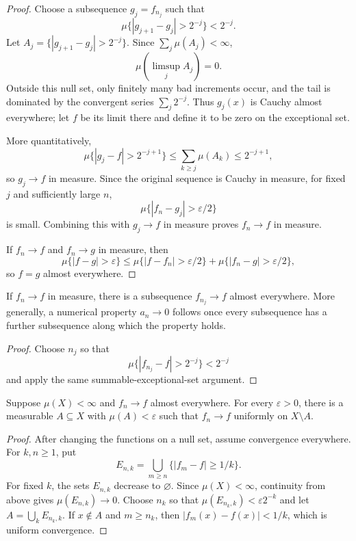 \begin{proof}
Choose a subsequence $g_j=f_{n_j}$ such that
\[
\mu\{|g_{j+1}-g_j|>2^{-j}\}<2^{-j}.
\]
Let $A_j=\{|g_{j+1}-g_j|>2^{-j}\}$. Since $\sum_j\mu(A_j)<\infty$,
\[
\mu(\limsup_jA_j)=0.
\]
Outside this null set, only finitely many bad increments occur, and the tail is dominated by the convergent series $\sum_j2^{-j}$. Thus $g_j(x)$ is Cauchy almost everywhere; let $f$ be its limit there and define it to be zero on the exceptional set.

More quantitatively,
\[
\mu\{|g_j-f|>2^{-j+1}\}
 \leq\sum_{k\geq j}\mu(A_k)
 \leq2^{-j+1},
\]
so $g_j\to f$ in measure. Since the original sequence is Cauchy in measure, for fixed $j$ and sufficiently large $n$,
\[
\mu\{|f_n-g_j|>\varepsilon/2\}
\]
is small. Combining this with $g_j\to f$ in measure proves $f_n\to f$ in measure.

If $f_n\to f$ and $f_n\to g$ in measure, then
\[
\mu\{|f-g|>\varepsilon\}
 \leq\mu\{|f-f_n|>\varepsilon/2\}
   +\mu\{|f_n-g|>\varepsilon/2\},
\]
so $f=g$ almost everywhere.
\end{proof}

\begin{cor}
If $f_n\to f$ in measure, there is a subsequence $f_{n_j}\to f$ almost everywhere. More generally, a numerical property $a_n\to0$ follows once every subsequence has a further subsequence along which the property holds.
\end{cor}

\begin{proof}
Choose $n_j$ so that
\[
\mu\{|f_{n_j}-f|>2^{-j}\}<2^{-j}
\]
and apply the same summable-exceptional-set argument.
\end{proof}

\begin{thm}[Egoroff]
Suppose $\mu(X)<\infty$ and $f_n\to f$ almost everywhere. For every $\varepsilon>0$, there is a measurable $A\subseteq X$ with $\mu(A)<\varepsilon$ such that $f_n\to f$ uniformly on $X\setminus A$.
\end{thm}

\begin{proof}
After changing the functions on a null set, assume convergence everywhere. For $k,n\geq1$, put
\[
E_{n,k}=\bigcup_{m\geq n}\{|f_m-f|\geq1/k\}.
\]
For fixed $k$, the sets $E_{n,k}$ decrease to $\varnothing$. Since $\mu(X)<\infty$, continuity from above gives $\mu(E_{n,k})\to0$. Choose $n_k$ so that $\mu(E_{n_k,k})<\varepsilon2^{-k}$ and let $A=\bigcup_kE_{n_k,k}$. If $x\notin A$ and $m\geq n_k$, then $|f_m(x)-f(x)|<1/k$, which is uniform convergence.
\end{proof}


